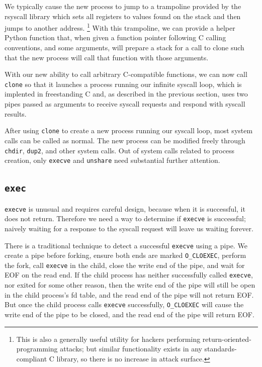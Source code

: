 \documentclass[sigplan]{acmart}
\begin{document}
We typically cause the new process to jump to a trampoline provided by the rsyscall library
which sets all registers to values found on the stack
and then jumps to another address.
\footnote{This is also a generally useful utility for hackers performing return-oriented-programming attacks;
but similar functionality exists in any standards-compliant C library,
so there is no increase in attack surface.}
With this trampoline,
we can provide a helper Python function that,
when given a function pointer following C calling conventions, and some arguments,
will prepare a stack for a call to clone such that the new process will call that function with those arguments.

With our new ability to call arbitrary C-compatible functions,
we can now call \texttt{clone} so that it launches a process running our infinite syscall loop,
which is implented in freestanding C and, as described in the previous section,
uses two pipes passed as arguments to receive syscall requests and respond with syscall results.

After using \texttt{clone} to create a new process running our syscall loop,
most system calls can be called as normal.
The new process can be modified freely through \texttt{chdir}, \texttt{dup2}, and other system calls.
Out of system calls related to process creation,
only \texttt{execve} and \texttt{unshare} need substantial further attention.
\subsection{\texttt{exec}}
\texttt{execve} is unusual and requires careful design,
because when it is successful, it does not return.
Therefore we need a way to determine if \texttt{execve} is successful;
naively waiting for a response to the syscall request will leave us waiting forever.

There is a traditional technique to detect a successful \texttt{execve} using a pipe.
We create a pipe before forking,
ensure both ends are marked \verb|O_CLOEXEC|,
perform the fork,
call \texttt{execve} in the child,
close the write end of the pipe,
and wait for EOF on the read end.
If the child process has neither successfully called \texttt{execve}, nor exited for some other reason,
then the write end of the pipe will still be open in the child process's fd table,
and the read end of the pipe will not return EOF.
But once the child process calls \texttt{execve} successfully,
\verb|O_CLOEXEC| will cause the write end of the pipe to be closed,
and the read end of the pipe will return EOF.
\end{document}
